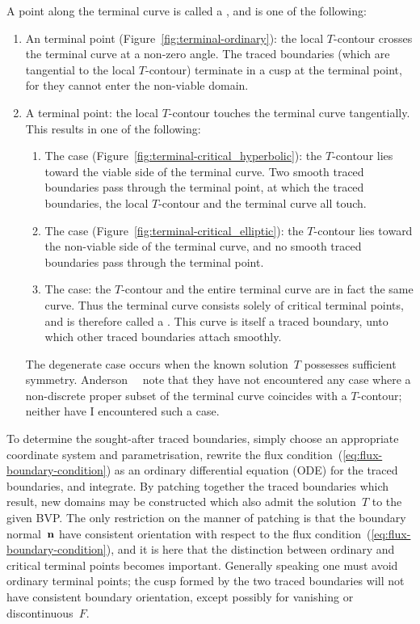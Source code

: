 A point along the terminal curve is called a ,
and is one of the following:
\begin{enumerate}
  \item
    An  terminal point
    (Figure~\ref{fig:terminal-ordinary}):
    the local $T$-contour crosses the terminal curve at a non-zero angle.
    The traced boundaries (which are tangential to the local $T$-contour)
    terminate in a cusp at the terminal point,
    for they cannot enter the non-viable domain.
  \item
    A  terminal point:
    the local $T$-contour touches the terminal curve tangentially.
    This results in one of the following:
    \begin{enumerate}
      \item
        The  case
        (Figure~\ref{fig:terminal-critical_hyperbolic}):
        the $T$-contour lies toward the viable side of the terminal curve.
        Two smooth traced boundaries pass through the terminal point,
        at which the traced boundaries,
        the local $T$-contour and the terminal curve
        all touch.
      \item
        The  case
        (Figure~\ref{fig:terminal-critical_elliptic}):
        the $T$-contour lies toward the non-viable side of the terminal curve,
        and no smooth traced boundaries pass through the terminal point.
      \item
        The  case:
        the $T$-contour and the entire terminal curve
        are in fact the same curve.
        Thus the terminal curve consists solely of critical terminal points,
        and is therefore called a .
        This curve is itself a traced boundary,
        unto which other traced boundaries attach smoothly.
    \end{enumerate}
    The degenerate case occurs
    when the known solution~$T$ possesses sufficient symmetry.
    Anderson~\etal~\cite{anderson-2007-boundary-tracing-i-theory}
    note that they have not encountered any case
    where a non-discrete proper subset of the terminal curve
    coincides with a $T$-contour;
    neither have I encountered such a case.
\end{enumerate}

To determine the sought-after traced boundaries,
simply choose an appropriate coordinate system and parametrisation,
rewrite the flux condition~(\ref{eq:flux-boundary-condition})
as an ordinary differential equation (ODE) for the traced boundaries,
and integrate.
By patching together the traced boundaries which result,
new domains may be constructed
which also admit the solution~$T$ to the given BVP\@.
The only restriction on the manner of patching
is that the boundary normal~$\mathop{}\!\boldsymbol{\mathbf{n}}$ have consistent orientation
with respect to the flux condition~(\ref{eq:flux-boundary-condition}),
and it is here that
the distinction between ordinary and critical terminal points
becomes important.
Generally speaking one must avoid ordinary terminal points;
the cusp formed by the two traced boundaries
will not have consistent boundary orientation,
except possibly for vanishing or discontinuous~$F$.

